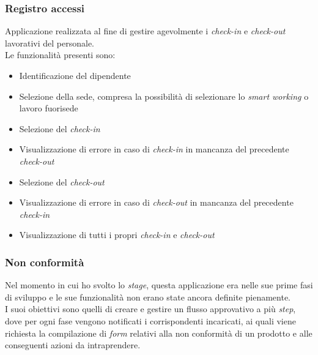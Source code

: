 \subsubsection*{Registro accessi}
Applicazione realizzata al fine di gestire agevolmente i \emph{check-in} e \emph{check-out} lavorativi del personale.\\
Le funzionalità presenti sono: 
\begin{itemize}
    \item Identificazione del dipendente
    \item Selezione della sede, compresa la possibilità di selezionare lo \emph{smart working} o lavoro fuorisede 
    \item Selezione del \emph{check-in} 
    \item Visualizzazione di errore in caso di \emph{check-in} in mancanza del precedente \emph{check-out} 
    \item Selezione del \emph{check-out} 
    \item Visualizzazione di errore in caso di \emph{check-out} in mancanza del precedente \emph{check-in} 
    \item Visualizzazione di tutti i propri \emph{check-in} e \emph{check-out} 
\end{itemize}

\subsubsection*{Non conformità}
Nel momento in cui ho svolto lo \emph{stage}, questa applicazione era nelle sue prime fasi di sviluppo e le sue funzionalità non erano state ancora definite pienamente.\\
I suoi obiettivi sono quelli di creare e gestire un flusso approvativo a più \emph{step}, dove per ogni fase vengono notificati i corrispondenti incaricati, ai quali viene richiesta la compilazione di \emph{form} relativi alla non conformità di un prodotto e alle conseguenti azioni da intraprendere.\\

